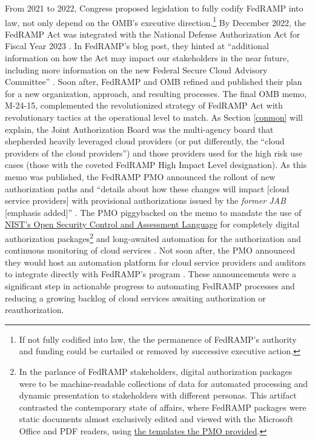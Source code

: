 \documentclass{jdf}
\begin{document}
From 2021 to 2022, Congress proposed legislation to fully codify FedRAMP into law, not only depend on the OMB's executive direction.\footnote{If not fully codified into law, the the permanence of FedRAMP's authority and funding could be curtailed or removed by successive executive action.} By December 2022, the FedRAMP Act was integrated with the National Defense Authorization Act for Fiscal Year 2023 \cite{ndaa2023}. In FedRAMP's blog post, they hinted at ``additional information on how the Act may impact our stakeholders in the near future, including more information on the new Federal Secure Cloud Advisory Committee'' \citeyear{fedramp_blog_ndaa2023}. Soon after, FedRAMP and OMB refined and published their plan for a new organization, approach, and resulting processes. The final OMB memo, M-24-15, complemented the revolutionized strategy of FedRAMP Act with revolutionary tactics at the operational level to match. As Section \ref{conmon} will explain, the Joint Authorization Board was the multi-agency board that shepherded heavily leveraged cloud providers (or put differently, the ``cloud providers of the cloud providers'') and those providers used for the high risk use cases (those with the coveted FedRAMP High Impact Level designation). As this memo was published, the FedRAMP PMO announced the rollout of new authorization paths and ``details about how these changes will impact [cloud service providers] with provisional authorizations issued by the \textit{former JAB} [emphasis added]'' \citeyear{fedramp_blog_phase24}. The PMO piggybacked on the memo to mandate the use of \href{https://pages.nist.gov/OSCAL}{NIST's Open Security Control and Assessment Language} for completely digital authorization packages\footnote{In the parlance of FedRAMP stakeholders, digital authorization packages were to be machine-readable collections of data for automated processing and dynamic presentation to stakeholders with different personas. This artifact contrasted the contemporary state of affairs, where FedRAMP packages were static documents almost exclusively edited and viewed with the Microsoft Office and PDF readers, using \href{https://web.archive.org/web/20250524170225/https://www.fedramp.gov/rev5/documents-templates/}{the templates the PMO provided}.} and long-awaited automation for the authorization and continuous monitoring of cloud services \citeyear{fedramp_blog_phase24}. Not soon after, the PMO announced they would host an automation platform for cloud service providers and auditors to integrate directly with FedRAMP's program \citeyear{fedramp_blog_platform24}. These announcements were a significant step in actionable progress to automating FedRAMP processes and reducing a growing backlog of cloud services awaiting authorization or reauthorization.
\end{document}
